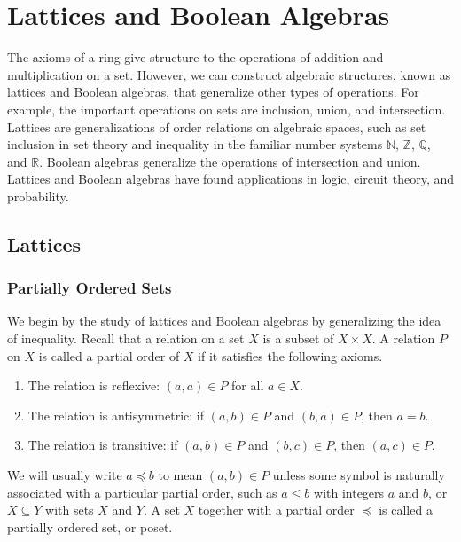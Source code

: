 \chapter{Lattices and Boolean Algebras}\label{boolean}

The axioms of a ring give structure to the operations of addition and multiplication on a set.  However, we can construct algebraic structures, known as lattices and Boolean algebras, that generalize other types of operations.  For example, the important operations on sets are inclusion, union, and intersection.  Lattices  are generalizations of order relations on algebraic spaces, such as set inclusion in set theory and inequality in the  familiar number systems ${\mathbb N}$, ${\mathbb Z}$, ${\mathbb Q}$, and ${\mathbb R}$.  Boolean algebras generalize the operations of intersection and union. Lattices and Boolean algebras have found applications in logic, circuit theory, and probability.   


\section{Lattices}\label{boolean_lattices}

\subsection*{Partially Ordered Sets}

We begin by the study of lattices and Boolean algebras by generalizing the idea of inequality. Recall that a {\bfi relation\/} on a set $X$ is a subset of $X \times X$.  A relation $P$ on $X$ is called a {\bfi partial order\/} of $X$ if it satisfies the following axioms.  
\begin{enumerate}

\item
The relation is {\bfi reflexive}: $(a, a) \in P$ for all $a \in X$.

\item
The relation is {\bfi antisymmetric}: if $(a,b) \in P$ and $(b,a) \in P$, then $a = b$.

\item
The relation is {\bfi transitive}: if $(a, b) \in P$ and $(b, c) \in P$, then $(a, c) \in P$.
 
\end{enumerate}
We will usually write $a \preceq b$\label{lessthan} to mean $(a, b) \in P$  unless some symbol is naturally associated with a particular partial order, such as $a \leq b$ with integers $a$ and $b$, or $X \subseteq Y$ with sets $X$ and $Y$.  A set $X$ together with a partial order $\preceq$ is called a {\bfi partially ordered set}, or {\bfi poset}. 

